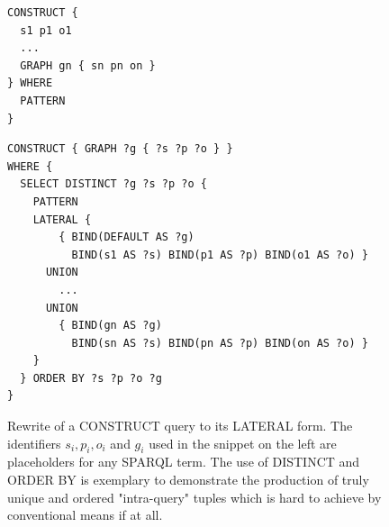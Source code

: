 


\begin{figure}[!h]
 \begin{minipage}[t]{0.29\textwidth}
  \centering
  \begin{lstlisting}[language=SPARQL]
CONSTRUCT {
  s1 p1 o1
  ...
  GRAPH gn { sn pn on }
} WHERE
  PATTERN
}
  \end{lstlisting}
 \end{minipage}
 \begin{minipage}[t]{0.69\textwidth}
  \centering
  \begin{lstlisting}[language=SPARQL]
CONSTRUCT { GRAPH ?g { ?s ?p ?o } }
WHERE {
  SELECT DISTINCT ?g ?s ?p ?o {
    PATTERN
    LATERAL {
        { BIND(DEFAULT AS ?g)
          BIND(s1 AS ?s) BIND(p1 AS ?p) BIND(o1 AS ?o) }
      UNION
        ...
      UNION
        { BIND(gn AS ?g)
          BIND(sn AS ?s) BIND(pn AS ?p) BIND(on AS ?o) }
    }
  } ORDER BY ?s ?p ?o ?g
}
  \end{lstlisting}
 \end{minipage}
 \vspace*{-5mm}
 \caption{Rewrite of a CONSTRUCT query to its LATERAL form. The identifiers $s_i, p_i, o_i$ and $g_i$ used in the snippet on the left are placeholders for any SPARQL term. The use of DISTINCT and ORDER BY is exemplary to demonstrate the production of truly unique and ordered "intra-query" tuples which is hard to achieve by conventional means if at all.}
\label{fig:construct-to-lateral}
\end{figure}



